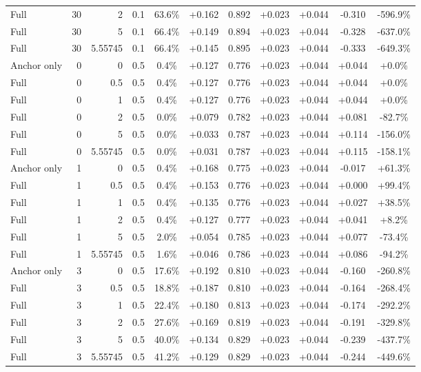 \begin{table}[htbp]
\begin{tabular}{lrrrccccccc}
Full & 30 & 2 & 0.1 & 63.6\% & +0.162 & 0.892 & +0.023 & +0.044 & -0.310 & -596.9\% \\
Full & 30 & 5 & 0.1 & 66.4\% & +0.149 & 0.894 & +0.023 & +0.044 & -0.328 & -637.0\% \\
Full & 30 & 5.55745 & 0.1 & 66.4\% & +0.145 & 0.895 & +0.023 & +0.044 & -0.333 & -649.3\% \\
Anchor only & 0 & 0 & 0.5 & 0.4\% & +0.127 & 0.776 & +0.023 & +0.044 & +0.044 & +0.0\% \\
Full & 0 & 0.5 & 0.5 & 0.4\% & +0.127 & 0.776 & +0.023 & +0.044 & +0.044 & +0.0\% \\
Full & 0 & 1 & 0.5 & 0.4\% & +0.127 & 0.776 & +0.023 & +0.044 & +0.044 & +0.0\% \\
Full & 0 & 2 & 0.5 & 0.0\% & +0.079 & 0.782 & +0.023 & +0.044 & +0.081 & -82.7\% \\
Full & 0 & 5 & 0.5 & 0.0\% & +0.033 & 0.787 & +0.023 & +0.044 & +0.114 & -156.0\% \\
Full & 0 & 5.55745 & 0.5 & 0.0\% & +0.031 & 0.787 & +0.023 & +0.044 & +0.115 & -158.1\% \\
Anchor only & 1 & 0 & 0.5 & 0.4\% & +0.168 & 0.775 & +0.023 & +0.044 & -0.017 & +61.3\% \\
Full & 1 & 0.5 & 0.5 & 0.4\% & +0.153 & 0.776 & +0.023 & +0.044 & +0.000 & +99.4\% \\
Full & 1 & 1 & 0.5 & 0.4\% & +0.135 & 0.776 & +0.023 & +0.044 & +0.027 & +38.5\% \\
Full & 1 & 2 & 0.5 & 0.4\% & +0.127 & 0.777 & +0.023 & +0.044 & +0.041 & +8.2\% \\
Full & 1 & 5 & 0.5 & 2.0\% & +0.054 & 0.785 & +0.023 & +0.044 & +0.077 & -73.4\% \\
Full & 1 & 5.55745 & 0.5 & 1.6\% & +0.046 & 0.786 & +0.023 & +0.044 & +0.086 & -94.2\% \\
Anchor only & 3 & 0 & 0.5 & 17.6\% & +0.192 & 0.810 & +0.023 & +0.044 & -0.160 & -260.8\% \\
Full & 3 & 0.5 & 0.5 & 18.8\% & +0.187 & 0.810 & +0.023 & +0.044 & -0.164 & -268.4\% \\
Full & 3 & 1 & 0.5 & 22.4\% & +0.180 & 0.813 & +0.023 & +0.044 & -0.174 & -292.2\% \\
Full & 3 & 2 & 0.5 & 27.6\% & +0.169 & 0.819 & +0.023 & +0.044 & -0.191 & -329.8\% \\
Full & 3 & 5 & 0.5 & 40.0\% & +0.134 & 0.829 & +0.023 & +0.044 & -0.239 & -437.7\% \\
Full & 3 & 5.55745 & 0.5 & 41.2\% & +0.129 & 0.829 & +0.023 & +0.044 & -0.244 & -449.6\% \\

\end{tabular}
\end{table}
